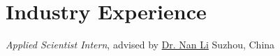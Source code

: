 \documentclass{resume}
\begin{document}



\section{Industry Experience}
\textit{Applied Scientist Intern}, advised by \href{https://nan-li.cn/}{Dr. Nan Li}
\hfill Suzhou, China
\end{document}
